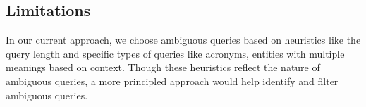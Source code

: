 \subsection{Limitations} In our current approach, we choose ambiguous queries based on heuristics like the query length and specific types of queries like acronyms, entities with multiple meanings based on context. Though these heuristics reflect the nature of ambiguous queries, a more principled approach would help identify and filter ambiguous queries.
\label{limitations}

